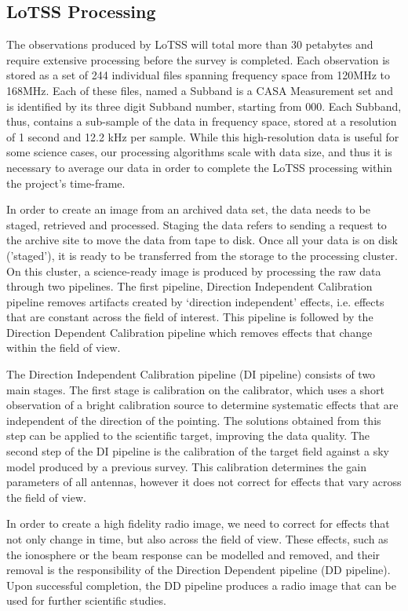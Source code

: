 \subsection{LoTSS Processing}

The observations produced by LoTSS will total more than 30 petabytes and require extensive processing before the survey is completed. Each observation is stored as a set of 244 individual files spanning frequency space from 120MHz to 168MHz. Each of these files, named a Subband is a CASA Measurement set and is identified by its three digit Subband number, starting from 000. Each Subband, thus, contains a sub-sample of the data in frequency space, stored at a resolution of 1 second and 12.2 kHz per sample. While this high-resolution data is useful for some science cases, our processing algorithms scale with data size, and thus it is necessary to average our data in order to complete the LoTSS processing within the project's time-frame. 

In order to create an image from an archived data set, the data needs to be staged, retrieved and processed. Staging the data refers to sending a request to the archive site to move the data from tape to disk. Once all your data is on disk ('staged'), it is ready to be transferred from the storage to the processing cluster. On this cluster, a science-ready image is produced by processing the raw data through two pipelines. The first pipeline, Direction Independent Calibration pipeline removes artifacts created by `direction independent' effects, i.e. effects that are constant across the field of interest. This pipeline is followed by the Direction Dependent Calibration pipeline which removes effects that change within the field of view.
 
The Direction Independent Calibration pipeline (DI pipeline) consists of two main stages. The first stage is calibration on the calibrator, which uses a short observation of a bright calibration source to determine systematic effects that are independent of the direction of the pointing. The solutions obtained from this step can be applied to the scientific target, improving the data quality. The second step of the DI pipeline is the calibration of the target field against a sky model produced by a previous survey. This calibration determines the gain parameters of all antennas, however it does not correct for effects that vary across the field of view. 
 
In order to create a high fidelity radio image, we need to correct for effects that not only change in time, but also across the field of view. These effects, such as the ionosphere or the beam response can be modelled and removed, and their removal is the responsibility of the Direction Dependent pipeline (DD pipeline). Upon successful completion, the DD pipeline produces a radio image that can be used for further scientific studies.

